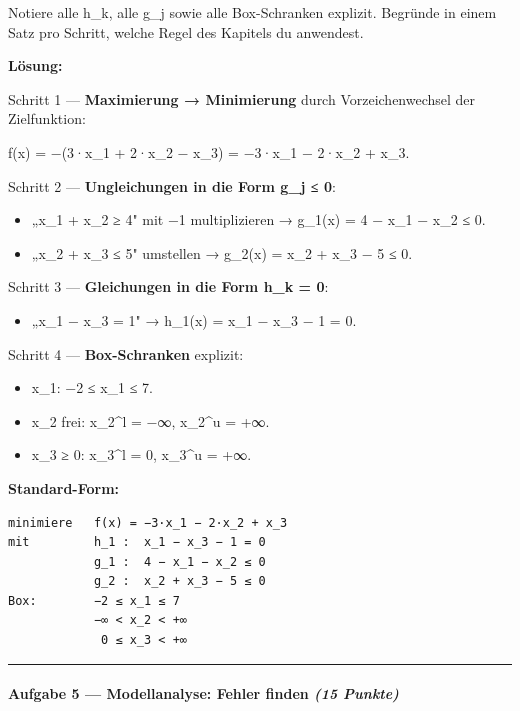 \documentclass[11pt, a4paper]{article}
\begin{document}
Notiere alle h\_k, alle g\_j sowie alle Box-Schranken explizit. Begründe in einem Satz pro Schritt, welche Regel des Kapitels du anwendest.


\textbf{Lösung:}


Schritt 1 — \textbf{Maximierung → Minimierung} durch Vorzeichenwechsel der Zielfunktion:


f(x) = −(3·x\_1 + 2·x\_2 − x\_3) = −3·x\_1 − 2·x\_2 + x\_3.


Schritt 2 — \textbf{Ungleichungen in die Form g\_j ≤ 0}:

\begin{itemize}
  \item „x\_1 + x\_2 ≥ 4" mit −1 multiplizieren  →  g\_1(x) = 4 − x\_1 − x\_2 ≤ 0.
  \item „x\_2 + x\_3 ≤ 5" umstellen  →  g\_2(x) = x\_2 + x\_3 − 5 ≤ 0.
\end{itemize}

Schritt 3 — \textbf{Gleichungen in die Form h\_k = 0}:

\begin{itemize}
  \item „x\_1 − x\_3 = 1"  →  h\_1(x) = x\_1 − x\_3 − 1 = 0.
\end{itemize}

Schritt 4 — \textbf{Box-Schranken} explizit:

\begin{itemize}
  \item x\_1: −2 ≤ x\_1 ≤ 7.
  \item x\_2 frei: x\_2\textasciicircum{}l = −∞, x\_2\textasciicircum{}u = +∞.
  \item x\_3 ≥ 0: x\_3\textasciicircum{}l = 0, x\_3\textasciicircum{}u = +∞.
\end{itemize}

\textbf{Standard-Form:}


\begin{lstlisting}
minimiere   f(x) = −3·x_1 − 2·x_2 + x_3
mit         h_1 :  x_1 − x_3 − 1 = 0
            g_1 :  4 − x_1 − x_2 ≤ 0
            g_2 :  x_2 + x_3 − 5 ≤ 0
Box:        −2 ≤ x_1 ≤ 7
            −∞ < x_2 < +∞
             0 ≤ x_3 < +∞
\end{lstlisting}



\noindent\textcolor{rulegray}{\rule{\linewidth}{0.4pt}}


\paragraph{Aufgabe 5 — Modellanalyse: Fehler finden \textit{(15 Punkte)}}\mbox{}\\[2pt]
\end{document}
